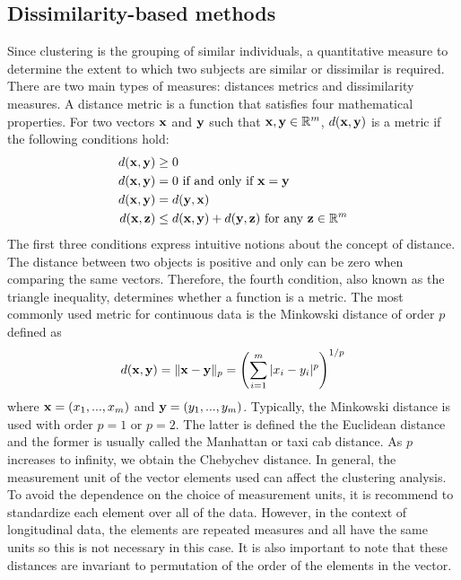 \subsection{Dissimilarity-based methods}
Since clustering is the grouping of similar individuals, a quantitative measure to determine the extent to which two subjects are similar or dissimilar is required.  There are two main types of measures: distances metrics and dissimilarity measures. A distance metric is a function that satisfies four mathematical properties. For two vectors $\mathbf x$ and $\mathbf y$ such that $\mathbf x,\mathbf y\in\mathbb{R}^{m}$, $d(\mathbf x,\mathbf y)$ is a metric if the following conditions hold:
\begin{align*}
d(\mathbf x,\mathbf y)&\geq 0 \\
d(\mathbf x,\mathbf y) &= 0\text{ if and only if } \mathbf x=\mathbf y\\
d(\mathbf x,\mathbf y) &= d(\mathbf y,\mathbf x)\\
d(\mathbf x,\mathbf z) &\leq d(\mathbf x,\mathbf y) + d(\mathbf y,\mathbf z)\text{ for any }\mathbf z\in \mathbb{R}^{m}
\end{align*}
The first three conditions express intuitive notions about the concept of distance. The distance between two objects is positive and only can be zero when comparing the same vectors. Therefore, the fourth condition, also known as the triangle inequality, determines whether a function is a metric. The most commonly used metric for continuous data is the Minkowski distance of order $p$ defined as
$$d(\mathbf x,\mathbf y) = \|\mathbf x - \mathbf y\|_{p} = \left(\sum^{m}_{i=1}|x_{i}-y_{i}|^{p}\right)^{1/p}$$
where $\mathbf x = (x_{1},...,x_{m})$ and $\mathbf y = (y_{1},...,y_{m})$. Typically, the Minkowski distance is used with order $p=1$ or $p=2$. The latter is defined the the Euclidean distance and the former is usually called the Manhattan or taxi cab distance. As $p$ increases to infinity, we obtain the Chebychev distance. In general, the measurement unit of the vector elements used can affect the clustering analysis. To avoid the dependence on the choice of measurement units, it is recommend to standardize each element over all of the data. However, in the context of longitudinal data, the elements are repeated measures and all have the same units so this is not necessary in this case. It is also important to note that these distances are invariant to permutation of the order of the elements in the vector.

